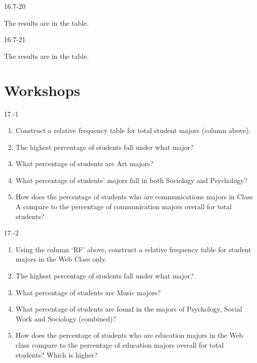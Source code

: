 \begin{exsol@solution}{16.7-20}

      The results are in the table.

\end{exsol@solution}
\begin{exsol@solution}{16.7-21}

  The results are in the table.


\end{exsol@solution}
\setcounter{chapter}{16}\chapter{Workshops}
\begin{exsol@solution}{17.-1}

  \begin{enumerate}
  \item Construct a relative frequency table for total student majors (column above).
  \item	The highest percentage of students fall under what major?
  \item	What percentage of students are Art majors?
  \item	What percentage of students’ majors fall in both Sociology and Psychology?
  \item	How does the percentage of students who are communications majors in Class A compare to the percentage of communication majors overall for total students?
\end{enumerate}
\end{exsol@solution}
\begin{exsol@solution}{17.-2}
  \begin{enumerate}
  \item	Using the column `RF' above, construct a relative frequency table for student majors in the Web Class only.
  \item	The highest percentage of students fall under what major?
  \item	What percentage of students are Music majors?
  \item	What percentage of students are found in the majors of Psychology, Social Work and Sociology (combined)?
  \item	How does the percentage of students who are education majors in the Web class compare to the percentage of education majors overall for total students?  Which is higher?
\end{enumerate}
\end{exsol@solution}
